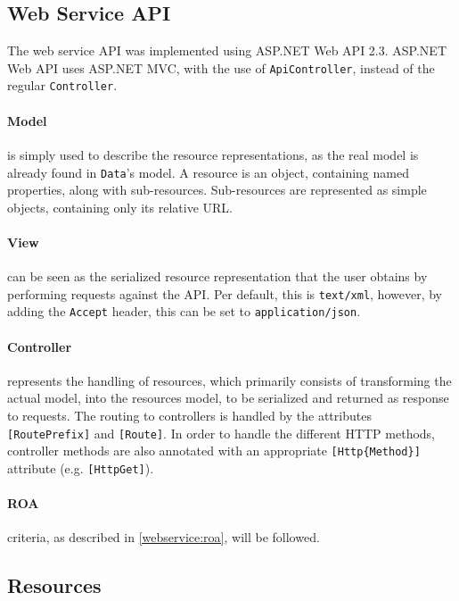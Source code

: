 \subsection{Web Service API}\label{design:web_service}
The web service API was implemented using ASP.NET Web API 2.3.\cite{aspnet_webapi}
ASP.NET Web API uses ASP.NET MVC\cite{aspnet_mvc}, with the use of \texttt{ApiController}, instead of the regular \texttt{Controller}.

\paragraph{Model} is simply used to describe the resource representations, as the real model is already found in \texttt{Data}'s model.
A resource is an object, containing named properties, along with sub-resources.
Sub-resources are represented as simple objects, containing only its relative URL.

\paragraph{View} can be seen as the serialized resource representation that the user obtains by performing requests against the API.
Per default, this is \texttt{text/xml}, however, by adding the \texttt{Accept} header, this can be set to \texttt{application/json}.

\paragraph{Controller} represents the handling of resources, which primarily consists of transforming the actual model, into the resources model, to be serialized and returned as response to requests.
The routing to controllers is handled by the attributes \texttt{[RoutePrefix]} and \texttt{[Route]}.
In order to handle the different HTTP methods, controller methods are also annotated with an appropriate \texttt{[Http\{Method\}]} attribute (e.g. \texttt{[HttpGet]}).

\paragraph{ROA} criteria, as described in \cref{webservice:roa}, will be followed.

\subsection{Resources}
\newcommand{\resource}[5]{\begin{description}
\item[URL:]{\texttt{#1}}
\item[Properties:]{\texttt{#2}}
\item[Resources:]{\texttt{#3}}
\item[Methods:]{\texttt{#4}}
\item[Responses:]{\texttt{#5}}
\end{description}}

